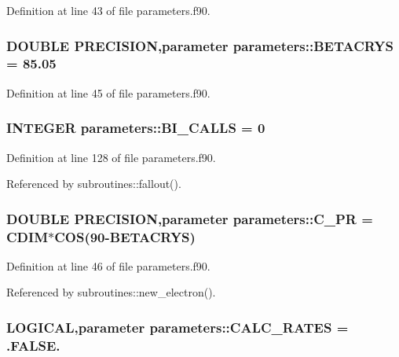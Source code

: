 Definition at line 43 of file parameters.f90.\hypertarget{namespaceparameters_aaa3c163a9f90b6d0c5a314ca449da18b}{
\subsubsection[{BETACRYS}]{\setlength{\rightskip}{0pt plus 5cm}DOUBLE PRECISION,parameter {\bf parameters::BETACRYS} = 85.05}}
\label{namespaceparameters_aaa3c163a9f90b6d0c5a314ca449da18b}


Definition at line 45 of file parameters.f90.\hypertarget{namespaceparameters_ab6952d11a1ce81d0d85183b89011553a}{
\subsubsection[{BI\_\-CALLS}]{\setlength{\rightskip}{0pt plus 5cm}INTEGER {\bf parameters::BI\_\-CALLS} = 0}}
\label{namespaceparameters_ab6952d11a1ce81d0d85183b89011553a}


Definition at line 128 of file parameters.f90.

Referenced by subroutines::fallout().\hypertarget{namespaceparameters_a998d2db873404e0cfe943d50d3877262}{
\subsubsection[{C\_\-PR}]{\setlength{\rightskip}{0pt plus 5cm}DOUBLE PRECISION,parameter {\bf parameters::C\_\-PR} = {\bf CDIM}$\ast$COS(90-\/{\bf BETACRYS})}}
\label{namespaceparameters_a998d2db873404e0cfe943d50d3877262}


Definition at line 46 of file parameters.f90.

Referenced by subroutines::new\_\-electron().\hypertarget{namespaceparameters_abf0f37eb423e843da77558c657a43220}{
\subsubsection[{CALC\_\-RATES}]{\setlength{\rightskip}{0pt plus 5cm}LOGICAL,parameter {\bf parameters::CALC\_\-RATES} = .FALSE.}}
\label{namespaceparameters_abf0f37eb423e843da77558c657a43220}


